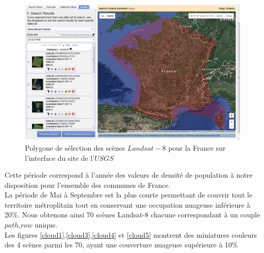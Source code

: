 \documentclass{book}
\begin{document}
\begin{figure}[H]
\begin{center}
\includegraphics[scale=0.5]{images/france-selection.png}
\end{center}
\caption{Polygone de sélection des scènes $Landsat-8$ pour la France sur l'interface du site de l'$USGS$}
\label{selection_france}
\end{figure}

\clearpage

Cette période correspond à l'année des valeurs de densité de population à notre disposition pour l'ensemble des communes de France.\\
La période de Mai à Septembre est la plus courte permettant de couvrir tout le territoire métroplitain tout en conservant une occupation
nuageuse inférieure à 20\%.
Nous obtenons ainsi 70 scènes Landsat-8 chacune correspondant à un couple $path$,$row$ unique.\\
Les figures \ref{cloud1},\ref{cloud3},\ref{cloud4} et \ref{cloud5} montrent des miniatures couleurs des 4 scènes parmi les 70, ayant une couverture 
nuageuse supérieure à 10\%
\end{document}
